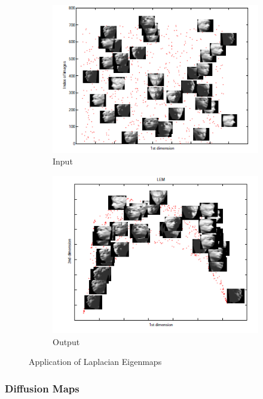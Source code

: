 \begin{figure}
\centering
\begin{subfigure}{.5\textwidth}
  \centering
  \includegraphics[width=\linewidth]{./Figures/original.png}
\caption{Input}
\end{subfigure}%
\begin{subfigure}{.5\textwidth}
  \centering
  \includegraphics[width=\linewidth]{./Figures/o_le.png}
  \caption{Output}
\end{subfigure}
\caption{Application of Laplacian Eigenmaps}
\label{app_le}
\end{figure}



\subsubsection{Diffusion Maps}
\label{s:dm}

